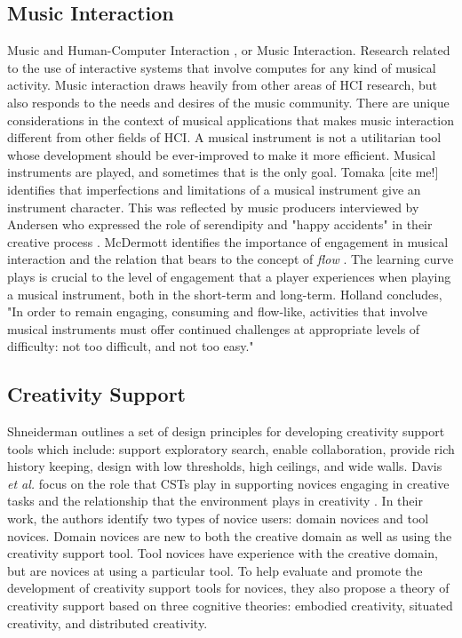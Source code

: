 \subsection{Music Interaction}
Music and Human-Computer Interaction \cite{holland2013music}, or Music Interaction. Research related to the use of interactive systems that involve computes for any kind of musical activity. Music interaction draws heavily from other areas of HCI research, but also responds to the needs and desires of the music community. There are unique considerations in the context of musical applications that makes music interaction different from other fields of HCI. A musical instrument is not a utilitarian tool whose development should be ever-improved to make it more efficient. Musical instruments are played, and sometimes that is the only goal. Tomaka [cite me!] identifies that imperfections and limitations of a musical instrument give an instrument character. This was reflected by music producers interviewed by Andersen who expressed the role of serendipity and "happy accidents" in their creative process \cite{andersen2016conversations}. McDermott \cite{mcdermott2013should} identifies the importance of engagement in musical interaction and the relation that bears to the concept of \textit{flow} \cite{csikszentmihalyi1990flow}. The learning curve plays is crucial to the level of engagement that a player experiences when playing a musical instrument, both in the short-term and long-term. Holland \cite{holland2013music} concludes, "In order to remain engaging, consuming and flow-like, activities that involve musical instruments must offer continued challenges at appropriate levels of difficulty: not too difficult, and not too easy."

\subsection{Creativity Support}
Shneiderman \cite{shneiderman2007creativity} outlines a set of design principles for developing creativity support tools which include: support exploratory search, enable collaboration, provide rich history keeping, design with low thresholds, high ceilings, and wide walls. Davis \textit{et al.} focus on the role that CSTs play in supporting novices engaging in creative tasks and the relationship that the environment plays in creativity \cite{davis2013toward}. In their work, the authors identify two types of novice users: domain novices and tool novices. Domain novices are new to both the creative domain as well as using the creativity support tool. Tool novices have experience with the creative domain, but are novices at using a particular tool. To help evaluate and promote the development of creativity support tools for novices, they also propose a theory of creativity support based on three cognitive theories: embodied creativity, situated creativity, and distributed creativity.

